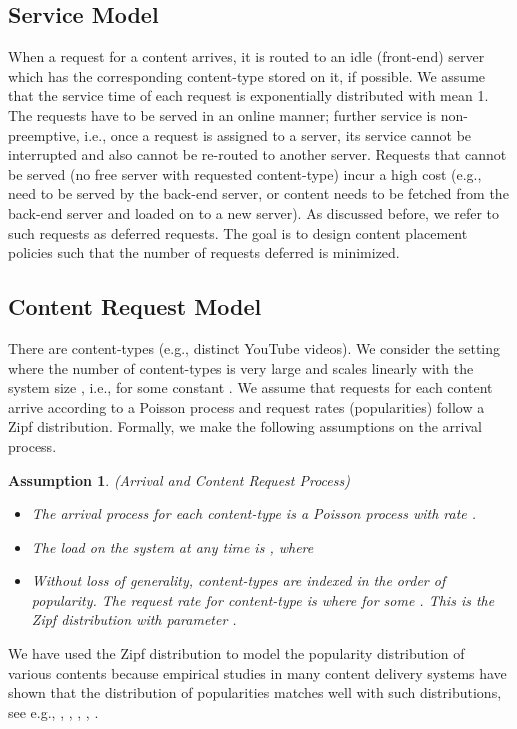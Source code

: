 \documentclass[10pt, conference, letterpaper]{IEEEtran}
\newtheorem{assumption}{Assumption}
\begin{document}
\subsection{Service Model}
When a request for a content arrives, it is routed to an idle
(front-end) server which has the corresponding content-type stored on
it, if possible. We assume that the service time of each request is
exponentially distributed with mean 1. The requests have to be served
in an online manner; further service is non-preemptive, i.e., once a
request is assigned to a server, its service cannot be interrupted and
also cannot be re-routed to another server. Requests that cannot be
served (no free server with requested content-type) incur a high cost
(e.g., need to be served by the back-end server, or content needs to
be fetched from the back-end server and loaded on to a new server). As
discussed before, we refer to such requests as deferred requests. The
goal is to design content placement policies such that the number of
requests deferred is minimized.

\subsection{Content Request Model}
There are  content-types (e.g.,  distinct YouTube videos). We
consider the setting where the number of content-types  is very
large and scales linearly with the system size , i.e.,  for some constant . We assume that requests for
each content arrive according to a Poisson process and request rates
(popularities) follow a Zipf distribution. Formally, we make the
following assumptions on the arrival process.
\begin{assumption}(Arrival and Content Request Process)
	\label{ass:zipf}
	\begin{itemize}
		\item[-] The arrival process for each content-type  is a Poisson
		process with rate .
		
		\item[-] The load on the system at any time is , where
		
		
		\item[-] Without loss of generality, content-types are indexed in the
		order of popularity. The request rate for content-type  is
		 where  for
		some . This is the Zipf distribution with parameter
		.
		
		
	\end{itemize}
\end{assumption}
We have used the Zipf distribution to model the popularity
distribution of various contents because empirical studies in many
content delivery systems have shown that the distribution of
popularities matches well with such distributions, see e.g.,
\cite{Gill07}, \cite{BC99}, \cite{YZ06}, \cite{IRF04}, \cite{VA02}.
\end{document}
